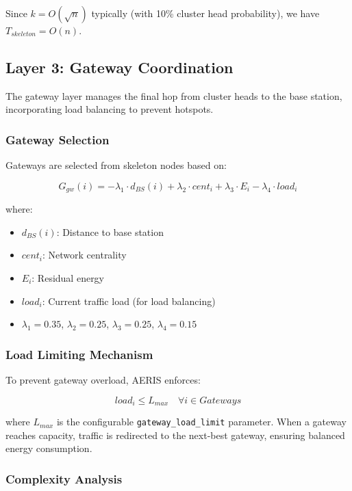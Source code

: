 Since $k = O(\sqrt{n})$ typically (with 10\% cluster head probability),
we have $T_{skeleton} = O(n)$.

\subsection{Layer 3: Gateway Coordination}

The gateway layer manages the final hop from cluster heads to the base
station, incorporating load balancing to prevent hotspots.

\subsubsection{Gateway Selection}

Gateways are selected from skeleton nodes based on:

\begin{equation}
G_{gw}(i) = -\lambda_1 \cdot d_{BS}(i) + \lambda_2 \cdot cent_i + \lambda_3 \cdot E_i - \lambda_4 \cdot load_i
\label{eq:gateway_score}
\end{equation}

where:
\begin{itemize}
    \item $d_{BS}(i)$: Distance to base station
    \item $cent_i$: Network centrality
    \item $E_i$: Residual energy
    \item $load_i$: Current traffic load (for load balancing)
    \item $\lambda_1 = 0.35$, $\lambda_2 = 0.25$, $\lambda_3 = 0.25$,
    $\lambda_4 = 0.15$
\end{itemize}

\subsubsection{Load Limiting Mechanism}

To prevent gateway overload, AERIS enforces:

\begin{equation}
load_i \leq L_{max} \quad \forall i \in Gateways
\label{eq:load_limit}
\end{equation}

where $L_{max}$ is the configurable \texttt{gateway\_load\_limit}
parameter. When a gateway reaches capacity, traffic is redirected to
the next-best gateway, ensuring balanced energy consumption.

\subsubsection{Complexity Analysis}


